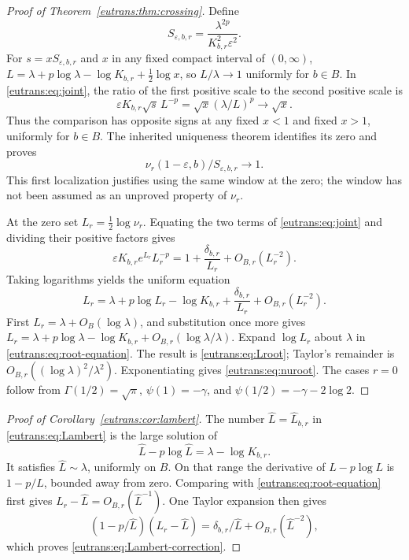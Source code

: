 \documentclass[11pt,a4paper]{article}
\numberwithin{equation}{section}
\theoremstyle{definition}
\theoremstyle{remark}
\begin{document}
\begin{proof}[Proof of Theorem~\ref{eutrans:thm:crossing}]
Define
\[
 S_{\varepsilon,b,r}=
        \frac{\lambda^{2p}}{K_{b,r}^2\varepsilon^2}.
\]
For $s=xS_{\varepsilon,b,r}$ and $x$ in any fixed compact interval
of $(0,\infty)$, $L=\lambda+p\log\lambda-\log K_{b,r}
+\tfrac12\log x$, so $L/\lambda\to1$ uniformly for $b\in B$.
In \eqref{eutrans:eq:joint}, the ratio of the first positive scale
to the second positive scale is
\[
 \varepsilon K_{b,r}\sqrt{s}\,L^{-p}
                =\sqrt{x}(\lambda/L)^p\longrightarrow\sqrt{x}.
\]
Thus the comparison has opposite signs at any fixed $x<1$ and
fixed $x>1$, uniformly for $b\in B$. The inherited uniqueness
theorem identifies its zero and proves
\[
 \nu_r(1-\varepsilon,b)/S_{\varepsilon,b,r}\longrightarrow1.
\]
This first localization justifies using the same window at the zero;
the window has not been assumed as an unproved property of $\nu_r$.

At the zero set $L_r=\tfrac12\log\nu_r$. Equating the two terms
of \eqref{eutrans:eq:joint} and dividing their positive factors gives
\[
 \varepsilon K_{b,r}e^{L_r}L_r^{-p}
       =1+\frac{\delta_{b,r}}{L_r}+O_{B,r}(L_r^{-2}).
\]
Taking logarithms yields the uniform equation
\begin{equation}\label{eutrans:eq:root-equation}
 L_r=\lambda+p\log L_r-\log K_{b,r}
                +\frac{\delta_{b,r}}{L_r}+O_{B,r}(L_r^{-2}).
\end{equation}
First $L_r=\lambda+O_B(\log\lambda)$, and substitution once more
gives $L_r=\lambda+p\log\lambda-\log K_{b,r}
+O_{B,r}(\log\lambda/\lambda)$. Expand $\log L_r$ about
$\lambda$ in \eqref{eutrans:eq:root-equation}. The result is
\eqref{eutrans:eq:Lroot}; Taylor's remainder is
$O_{B,r}((\log\lambda)^2/\lambda^2)$. Exponentiating gives
\eqref{eutrans:eq:nuroot}. The cases $r=0$ follow from
$\Gamma(1/2)=\sqrt\pi$, $\psi(1)=-\gamma$, and
$\psi(1/2)=-\gamma-2\log2$.
\end{proof}

\begin{proof}[Proof of Corollary~\ref{eutrans:cor:lambert}]
The number $\widehat L=\widehat L_{b,r}$ in
\eqref{eutrans:eq:Lambert} is the large solution of
\[
 \widehat L-p\log\widehat L=\lambda-\log K_{b,r}.
\]
It satisfies $\widehat L\sim\lambda$, uniformly on $B$.
On that range the derivative of $L-p\log L$ is
$1-p/L$, bounded away from zero. Comparing with
\eqref{eutrans:eq:root-equation} first gives
$L_r-\widehat L=O_{B,r}(\widehat L^{-1})$. One Taylor expansion
then gives
\[
 (1-p/\widehat L)(L_r-\widehat L)
     =\delta_{b,r}/\widehat L+O_{B,r}(\widehat L^{-2}),
\]
which proves \eqref{eutrans:eq:Lambert-correction}.
\end{proof}
\end{document}
